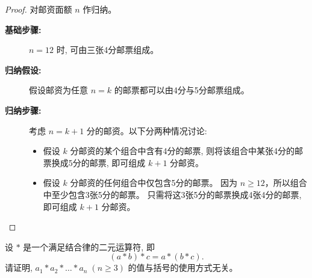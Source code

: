 \documentclass[a4paper, justified]{tufte-handout}
\begin{document}
\begin{proof}
  对邮资面额 $n$ 作归纳。
  \begin{description}
    \item[{\bf 基础步骤:}] $n = 12$ 时, 可由三张4分邮票组成。
    \item[{\bf 归纳假设:}] 假设邮资为任意 $n = k$ 的邮票都可以由4分与5分邮票组成。
    \item[{\bf 归纳步骤:}] 考虑 $n = k + 1$ 分的邮资。以下分两种情况讨论:
      \begin{itemize}
        \item 假设 $k$ 分邮资的某个组合中含有4分的邮票,
          则将该组合中某张4分的邮票换成5分的邮票, 即可组成 $k+1$ 分邮资。
        \item 假设 $k$ 分邮资的任何组合中仅包含5分的邮票。
          因为 $n \ge 12$，所以组合中至少包含3张5分的邮票。
          只需将这3张5分的邮票换成4张4分的邮票, 即可组成 $k+1$ 分邮资。
      \end{itemize}
  \end{description}
\end{proof}

\begin{problem}
  设 $\ast$ 是一个满足结合律的二元运算符, 即
  \[
    (a \ast b) \ast c = a \ast (b \ast c).
  \]
  请证明, $a_{1} \ast a_{2} \ast \dots \ast a_{n}\; (n \ge 3)$
  的值与括号的使用方式无关。
\end{problem}
\end{document}
